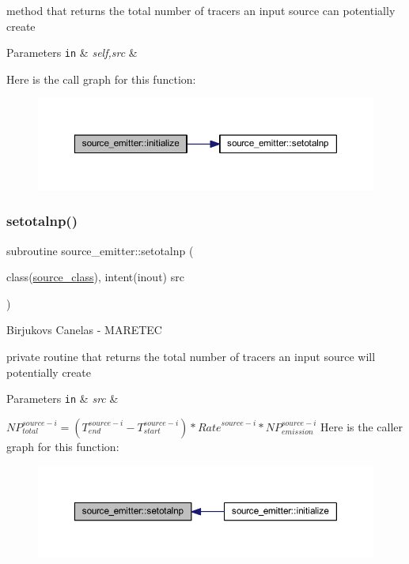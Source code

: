 method that returns the total number of tracers an input source can potentially create 
\begin{DoxyParams}[1]{Parameters}
\mbox{\tt in}  & {\em self,src} & \\
\hline
\end{DoxyParams}
Here is the call graph for this function\+:\nopagebreak
\begin{figure}[H]
\begin{center}
\leavevmode
\includegraphics[width=350pt]{namespacesource__emitter_a18e5a215687e0f5f13c0148be0f0c0e6_cgraph}
\end{center}
\end{figure}
\mbox{\label{namespacesource__emitter_a73d054a39fc1fccfde74173a5c7f2c58}} 
\subsubsection{\texorpdfstring{setotalnp()}{setotalnp()}}
{\footnotesize\ttfamily subroutine source\+\_\+emitter\+::setotalnp (\begin{DoxyParamCaption}\item[{class(\mbox{\hyperlink{structsource__identity_1_1source__class}{source\+\_\+class}}), intent(inout)}]{src }\end{DoxyParamCaption})\hspace{0.3cm}{\ttfamily [private]}}



Birjukovs Canelas -\/ M\+A\+R\+E\+T\+EC 

private routine that returns the total number of tracers an input source will potentially create 
\begin{DoxyParams}[1]{Parameters}
\mbox{\tt in}  & {\em src} & \\
\hline
\end{DoxyParams}
${NP}_{total}^{source-i}=(T_{end}^{source-i}-T_{start}^{source-i})*{Rate}^{source-i}*{NP}_{emission}^{source-i}$ Here is the caller graph for this function\+:\nopagebreak
\begin{figure}[H]
\begin{center}
\leavevmode
\includegraphics[width=350pt]{namespacesource__emitter_a73d054a39fc1fccfde74173a5c7f2c58_icgraph}
\end{center}
\end{figure}


